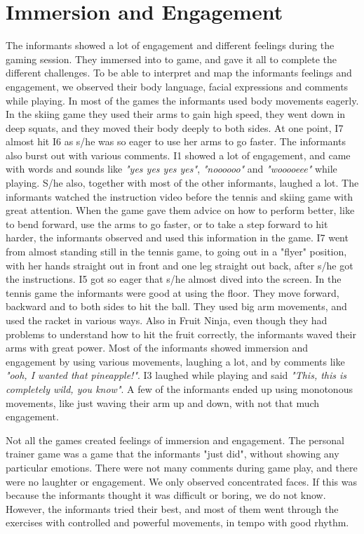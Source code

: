 \section{Immersion and Engagement}
The informants showed a lot of engagement and different feelings during the gaming session. They immersed into to game, and gave it all to complete the different challenges. To be able to interpret and map the informants feelings and engagement, we observed their body language, facial expressions and comments while playing. In most of the games the informants used body movements eagerly. In the skiing game they used their arms to gain high speed, they went down in deep squats, and they moved their body deeply to both sides. At one point, I7 almost hit I6 as s/he was so eager to use her arms to go faster. The informants also burst out with various comments. I1 showed a lot of engagement, and came with words and sounds like \emph{"yes yes yes yes"}, \emph{"noooooo"} and \emph{"wooooeee"} while playing. S/he also, together with most of the other informants, laughed a lot. The informants watched the instruction video before the tennis and skiing game with great attention. When the game gave them advice on how to perform better, like to bend forward, use the arms to go faster, or to take a step forward to hit harder, the informants observed and used this information in the game. I7 went from almost standing still in the tennis game, to going out in a "flyer" position, with her hands straight out in front and one leg straight out back, after s/he got the instructions. I5 got so eager that s/he almost dived into the screen. In the tennis game the informants were good at using the floor. They move forward, backward and to both sides to hit the ball. They used big arm movements, and used the racket in various ways. Also in Fruit Ninja, even though they had problems to understand how to hit the fruit correctly, the informants waved their arms with great power. Most of the informants showed immersion and engagement by using various movements, laughing a lot, and by comments like \emph{"ooh, I wanted that pineapple!"}. I3 laughed while playing and said \emph{"This, this is completely wild, you know"}. A few of the informants ended up using monotonous movements, like just waving their arm up and down, with not that much engagement. 

Not all the games created feelings of immersion and engagement. The personal trainer game was a game that the informants "just did", without showing any particular emotions. There were not many comments during game play, and there were no laughter or engagement. We only observed concentrated faces. If this was because the informants thought it was difficult or boring, we do not know. However, the informants tried their best, and most of them went through the exercises with controlled and powerful movements, in tempo with good rhythm.       

